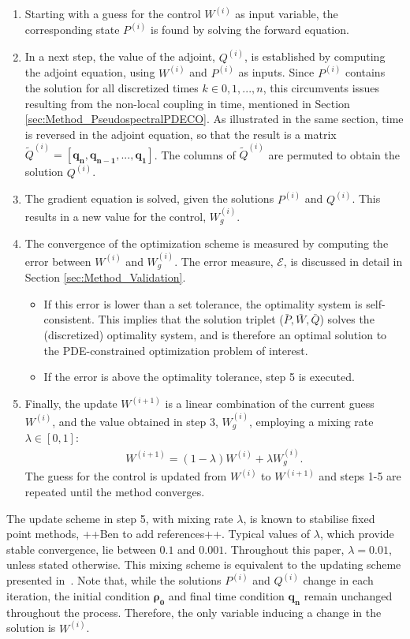 \documentclass[11pt, a4paper]{article}
\theoremstyle{definition}
\newcommand{\adj}{q}
\begin{document}
\begin{enumerate}
	\item Starting with a guess for the control $W^{(i)}$ as input variable, the corresponding state $P^{(i)}$ is found by solving the forward equation.
	\item In a next step, the value of the adjoint, $Q^{(i)}$, is established by computing the adjoint equation, using $W^{(i)}$ and $P^{(i)}$ as inputs. Since $P^{(i)}$ contains the solution for all discretized times $k \in 0,1,...,n$, this circumvents issues resulting from the non-local coupling in time, mentioned in Section \ref{sec:Method_PseudospectralPDECO}. As illustrated in the same section, time is reversed in the adjoint equation, so that the result is a matrix $\tilde{Q}^{(i)} =  [\boldsymbol{\adj_n},\boldsymbol{\adj_{n-1}}, ..., \boldsymbol{\adj_1} ]$. The columns of $\tilde{Q}^{(i)}$ are permuted to obtain the solution  $Q^{(i)}$.
	\item The gradient equation is solved, given the solutions $P^{(i)}$ and $Q^{(i)}$. This results in a new value for the control, $W^{(i)}_g$.
	\item  The convergence of the optimization scheme is measured by computing the error between $W^{(i)}$ and $W^{(i)}_{g}$. The error measure, $\mathcal{E}$, is discussed in detail in Section \ref{sec:Method_Validation}. 
	\begin{itemize}
		\item  If this error is lower than a set tolerance, the optimality system is self-consistent. This implies that the solution triplet ($\bar{P},\bar{W},\bar{Q}$) solves the (discretized) optimality system, and is therefore an optimal solution to the PDE-constrained optimization problem of interest.
		\item If the error is above the optimality tolerance, step 5 is executed.
	\end{itemize}
	\item Finally, the update $W^{(i+1)}$ is a linear combination of the current guess $W^{(i)}$, and the value obtained in step 3, $W^{(i)}_{g}$, employing a mixing rate $\lambda \in [0,1]$:
	\begin{align*}
	W^{(i+1)} = (1-\lambda)W^{(i)} + \lambda W^{(i)}_{g}.
	\end{align*}
	The guess for the control is updated from $W^{(i)} $ to $W^{(i+1)} $ and steps 1-5 are repeated until the method converges. 
\end{enumerate}
\vspace{0.3cm}
The update scheme in step 5, with mixing rate $\lambda$, is known to stabilise fixed point methods, ++Ben to add references++. Typical values of $\lambda$, which provide stable convergence, lie between $0.1$ and $0.001$. Throughout this paper, $\lambda =0.01$, unless stated otherwise. This mixing scheme is equivalent to the updating scheme presented in~\cite{Burger1}. 
Note that, while the solutions $P^{(i)}$ and $Q^{(i)}$ change in each iteration, the initial condition $\boldsymbol{\rho_0}$ and final time condition $\boldsymbol{\adj_n}$ remain unchanged throughout the process. Therefore, the only variable inducing a change in the solution is $W^{(i)}$.
\end{document}
